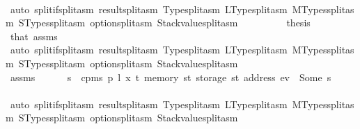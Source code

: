 \begin{isabellebody}
\ \ \ \ \ \ \ \ \isamarkupfalse%
\ {\isacharparenleft}{\kern0pt}auto\ split{\isacharcolon}{\kern0pt}if{\isacharunderscore}{\kern0pt}split{\isacharunderscore}{\kern0pt}asm\ result{\isachardot}{\kern0pt}split{\isacharunderscore}{\kern0pt}asm\ Type{\isachardot}{\kern0pt}split{\isacharunderscore}{\kern0pt}asm\ LType{\isachardot}{\kern0pt}split{\isacharunderscore}{\kern0pt}asm\ MTypes{\isachardot}{\kern0pt}split{\isacharunderscore}{\kern0pt}asm\ STypes{\isachardot}{\kern0pt}split{\isacharunderscore}{\kern0pt}asm\ option{\isachardot}{\kern0pt}split{\isacharunderscore}{\kern0pt}asm\ Stackvalue{\isachardot}{\kern0pt}split{\isacharunderscore}{\kern0pt}asm{\isacharparenright}{\kern0pt}\isanewline
\ \ \ \ \ \ \isamarkupfalse%
\ \isamarkupfalse%
\ {\isacharquery}{\kern0pt}thesis\ \isamarkupfalse%
\ that{\isacharparenleft}{\kern0pt}{}{\isacharparenright}{\kern0pt}\ assms\ {}\isanewline
\ \ \ \ \ \ \ \ \isamarkupfalse%
\ {\isacharparenleft}{\kern0pt}auto\ split{\isacharcolon}{\kern0pt}if{\isacharunderscore}{\kern0pt}split{\isacharunderscore}{\kern0pt}asm\ result{\isachardot}{\kern0pt}split{\isacharunderscore}{\kern0pt}asm\ Type{\isachardot}{\kern0pt}split{\isacharunderscore}{\kern0pt}asm\ LType{\isachardot}{\kern0pt}split{\isacharunderscore}{\kern0pt}asm\ MTypes{\isachardot}{\kern0pt}split{\isacharunderscore}{\kern0pt}asm\ STypes{\isachardot}{\kern0pt}split{\isacharunderscore}{\kern0pt}asm\ option{\isachardot}{\kern0pt}split{\isacharunderscore}{\kern0pt}asm\ Stackvalue{\isachardot}{\kern0pt}split{\isacharunderscore}{\kern0pt}asm{\isacharparenright}{\kern0pt}\isanewline
\ \ \ \ \isamarkupfalse%
\isanewline
\ \ \ \ \ \ \isamarkupfalse%
\ {}{}\isanewline
\ \ \ \ \ \ \isamarkupfalse%
\ \isamarkupfalse%
\ assms\ {}\ {}{}\ {}\ {}\ \isamarkupfalse%
\ s\ \ {\isachardoublequoteopen}cpm{}s\ p\ l\ x\ t\ {\isacharparenleft}{\kern0pt}memory\ st{\isacharparenright}{\kern0pt}\ {\isacharparenleft}{\kern0pt}storage\ st\ {\isacharparenleft}{\kern0pt}address\ ev{\isacharparenright}{\kern0pt}{\isacharparenright}{\kern0pt}\ {\isacharequal}{\kern0pt}\ Some\ s{\isachardoublequoteclose}\isanewline
\ \ \ \ \ \ \ \ \isamarkupfalse%
\ {\isacharparenleft}{\kern0pt}auto\ split{\isacharcolon}{\kern0pt}if{\isacharunderscore}{\kern0pt}split{\isacharunderscore}{\kern0pt}asm\ result{\isachardot}{\kern0pt}split{\isacharunderscore}{\kern0pt}asm\ Type{\isachardot}{\kern0pt}split{\isacharunderscore}{\kern0pt}asm\ LType{\isachardot}{\kern0pt}split{\isacharunderscore}{\kern0pt}asm\ MTypes{\isachardot}{\kern0pt}split{\isacharunderscore}{\kern0pt}asm\ STypes{\isachardot}{\kern0pt}split{\isacharunderscore}{\kern0pt}asm\ option{\isachardot}{\kern0pt}split{\isacharunderscore}{\kern0pt}asm\ Stackvalue{\isachardot}{\kern0pt}split{\isacharunderscore}{\kern0pt}asm{\isacharparenright}{\kern0pt}\isanewline

\end{isabellebody}

